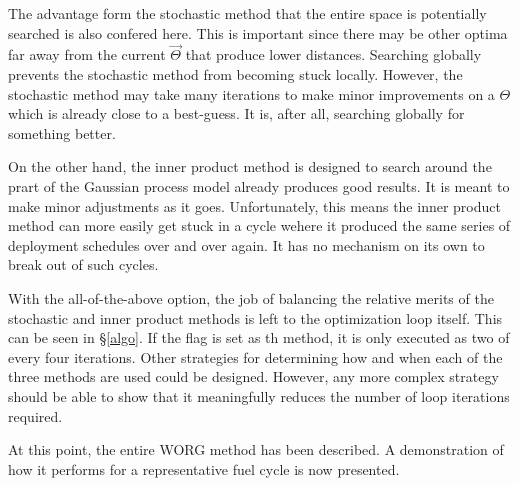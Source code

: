The advantage form the stochastic method that the entire space is potentially 
searched is also confered here.  This is important since there may be other
optima far away from the current $\vec{\Theta}$ that produce lower distances.
Searching globally prevents the stochastic method from becoming stuck locally.
However, the stochastic method may take many iterations to 
make minor improvements on a $\Theta$ which is already close to a best-guess.
It is, after all, searching globally for something better.

On the other hand, the inner product method is designed to search around 
the prart of the Gaussian process model already produces good results. It
is meant to make minor adjustments as it goes.  Unfortunately, this means
the inner product method can more easily get stuck in a cycle  wehere it 
produced the same series of deployment schedules over and over again. 
It has no mechanism on its own to break out of such cycles.

With the all-of-the-above option, the job of balancing the relative merits
of the stochastic and inner product methods is left to the optimization 
loop itself.  This can be seen in \S\ref{algo}.  If the \allflag flag 
is set as th method, it is only executed as \allflag two of every four 
iterations.  Other strategies for determining how and when each of the 
three methods are used could be designed. However, any more complex strategy 
should be able to show that it meaningfully reduces the number of loop 
iterations required.

At this point, the entire WORG method has been described. A
demonstration of how it performs for a representative fuel cycle is now
presented. 